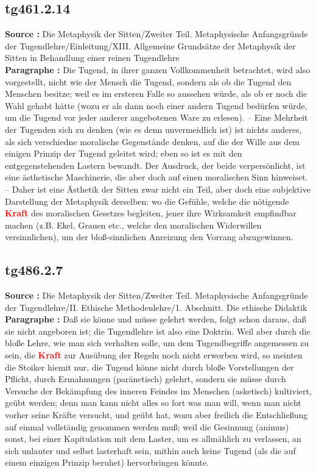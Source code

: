 \documentclass[a4paper,12pt,twoside]{book}
\newcommand{\match}[1]{\textcolor{red}{\textbf{#1}}}
\begin{document}
	\subsection*{tg461.2.14} 
	\textbf{Source : }Die Metaphysik der Sitten/Zweiter Teil. Metaphysische Anfangsgründe der Tugendlehre/Einleitung/XIII. Allgemeine Grundsätze der Metaphysik der Sitten in Behandlung einer reinen Tugendlehre\\  
	
	\textbf{Paragraphe : }Die Tugend, in ihrer ganzen Vollkommenheit betrachtet, wird also vorgestellt, nicht wie der Mensch die Tugend, sondern als ob die Tugend den Menschen besitze; weil es im ersteren Falle so aussehen würde, als ob er noch die Wahl gehabt hätte (wozu er als dann noch einer andern Tugend bedürfen würde, um die Tugend vor jeder anderer angebotenen Ware zu erlesen). – Eine Mehrheit der Tugenden sich zu denken (wie es denn unvermeidlich ist) ist nichts anderes, als sich verschiedne moralische Gegenstände denken, auf die der Wille aus dem einigen Prinzip der Tugend geleitet wird; eben so ist es mit den entgegenstehenden Lastern bewandt. Der Ausdruck, der beide verpersönlicht, ist eine ästhetische Maschinerie, die aber doch auf einen moralischen Sinn hinweiset. – Daher ist eine Ästhetik der Sitten zwar nicht ein Teil, aber doch eine subjektive Darstellung der Metaphysik derselben: wo die Gefühle, welche die nötigende \match{Kraft} des moralischen Gesetzes begleiten, jener ihre Wirksamkeit empfindbar machen (z.B. Ekel, Grauen etc., welche den moralischen Widerwillen versinnlichen), um der bloß-sinnlichen Anreizung den Vorrang abzugewinnen. 
	
	\subsection*{tg486.2.7} 
	\textbf{Source : }Die Metaphysik der Sitten/Zweiter Teil. Metaphysische Anfangsgründe der Tugendlehre/II. Ethische Methodenlehre/1. Abschnitt. Die ethische Didaktik\\  
	
	\textbf{Paragraphe : }Daß sie könne und müsse gelehrt werden, folgt schon daraus, daß sie nicht angeboren ist; die Tugendlehre ist also eine Doktrin. Weil aber durch die bloße Lehre, wie man sich verhalten solle, um dem Tugendbegriffe angemessen zu sein, die \match{Kraft} zur Ausübung der Regeln noch nicht erworben wird, so meinten die Stoiker hiemit nur, die Tugend könne nicht durch bloße Vorstellungen der Pflicht, durch Ermahnungen (paränetisch) gelehrt, sondern sie müsse durch Versuche der Bekämpfung des inneren Feindes im Menschen (asketisch) kultiviert, geübt werden; denn man kann nicht alles so fort was man will, wenn man nicht vorher seine Kräfte versucht, und geübt hat, wozu aber freilich die Entschließung auf einmal vollständig genommen werden muß; weil die Gesinnung (animus) sonst, bei einer Kapitulation mit dem Laster, um es allmählich zu verlassen, an sich unlauter und selbst lasterhaft sein, mithin auch keine Tugend (als die auf einem einzigen Prinzip beruhet) hervorbringen könnte. 
	
\end{document}
